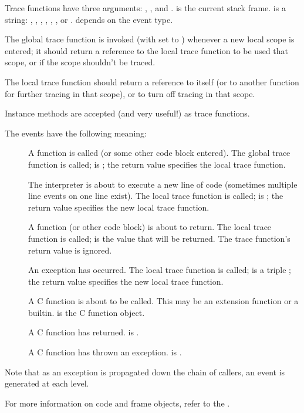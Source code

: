 Trace functions have three arguments: , , and
.  is the current stack frame.   is a
string: , , , ,
 , , or . 
 depends on the event type.

The global trace function is invoked (with  set to
) whenever a new local scope is entered; it should return
a reference to the local trace function to be used that scope, or
 if the scope shouldn't be traced.

The local trace function should return a reference to itself (or to
another function for further tracing in that scope), or  to
turn off tracing in that scope.

Instance methods are accepted (and very useful!) as trace functions.

The events have the following meaning:

\begin{description}

\item[]
A function is called (or some other code block entered).  The global
trace function is called;  is ;
the return value specifies the local trace function.

\item[]
The interpreter is about to execute a new line of code (sometimes
multiple line events on one line exist).  The local trace function is
called;  is ; the return value specifies the new
local trace function.

\item[]
A function (or other code block) is about to return.  The local trace
function is called;  is the value that will be returned.  The
trace function's return value is ignored.

\item[]
An exception has occurred.  The local trace function is called;
 is a triple ; the return value specifies the new local trace
function.

\item[]
A C function is about to be called.  This may be an extension function
or a builtin.   is the C function object.

\item[]
A C function has returned.  is .

\item[]
A C function has thrown an exception.   is .

\end{description}

Note that as an exception is propagated down the chain of callers, an
 event is generated at each level.

For more information on code and frame objects, refer to the
.
